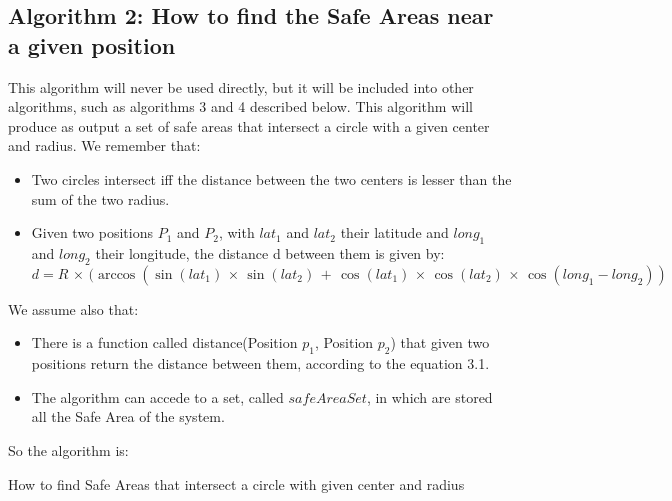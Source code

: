\subsection{Algorithm 2: How to find the Safe Areas near a given position}
This algorithm will never be used directly, but it will be included into other algorithms, such as algorithms 3 and 4 described below. 
This algorithm will produce as output a set of safe areas that intersect a circle with a given center and radius.
We remember that:
\begin{itemize}
\item Two circles intersect iff the distance between the two centers is lesser than the sum of the two radius.
\item Given two positions $P_{1}$ and $P_{2}$, with $lat_{1}$ and $lat_{2}$ their latitude and $long_{1}$ and $long_{2}$ their longitude, the distance d between them is given by:
\begin{equation}
d = R\,\times\,(\arccos (\sin (lat_{1})\, \times\, \sin (lat_{2})\, +\, \cos (lat_{1})\, \times\, \cos (lat_{2})\, \times\, \cos(long_{1} - long_{2}))
\end{equation}
\end{itemize}
We assume also that:
\begin{itemize}
\item There is a function called distance(Position $p_{1}$, Position $p_{2}$) that given two positions return the distance between them, according to the equation 3.1.
\item The algorithm can accede to a set, called $safeAreaSet$, in which are stored all the Safe Area of the system.
\end{itemize}

So the algorithm is:

\begin{algorithm}[H]


	\BlankLine
{}
\Return \Res \;
\caption{How to find Safe Areas that intersect a circle with given center and radius}
\end{algorithm}

